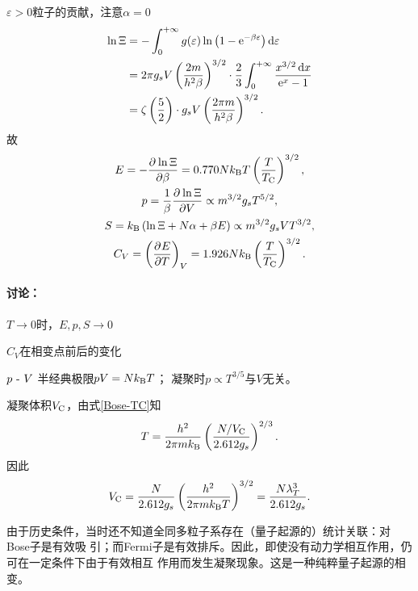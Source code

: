$\varepsilon>0$粒子的贡献，注意$\alpha=0$
\begin{align}\notag
	\ln\Xi&=-\int\zti g(\varepsilon)\ln\kh{1-\e{-\beta\varepsilon}}\d\varepsilon\\\notag
	&=2\pi g_sV\kh{\frac{2m}{h^2\beta}}^{3/2}\cdot\frac23\int\zti\frac{x^{3/2}\d x}{\e x-1}\\
	&=\zeta\kh{\frac52}\cdot g_sV\kh{\frac{2\pi m}{h^2\beta}}^{3/2}.%
\end{align}
故
\begin{gather}
	E=-\frac{\partial^{{}}\ln\Xi}{\partial{\beta}^{{}}}=0.770Nk_{\mathrm B} T\left(\frac T{T_\mathrm C}\right)^{3/2},\\
	p=\frac1\beta\frac{\partial^{{}}\ln\Xi}{\partial{V}^{{}}}\propto m^{3/2}g_sT^{5/2},\\
	S=k_{\mathrm B}\left(\ln\Xi+N\alpha+\beta E\right)\propto m^{3/2}g_sVT^{3/2},\\
	C_V=\left(\frac{\partial^{{}}E}{\partial{T}^{{}}}\right)_V=1.926Nk_{\mathrm B}\left(\frac T{T_\mathrm C}\right)^{3/2}.
\end{gather}
\paragraph{讨论：}
\begin{compactenum}
	\item $T\to 0$时，$E,p,S\to0$
	\item $C_V$在相变点前后的变化
	\begin{center}
	\end{center}
	\item $p~\text{-}~  V$
		\subitem 半经典极限$pV=Nk_{\mathrm B} T$；
		\subitem 凝聚时$p\propto T^{3/5}$与$V$无关。
	\item 凝聚体积$V_\mathrm C$，由式\eqref{Bose-TC}知
	\[
	T=\frac{h^2}{2\pi mk_{\mathrm B}}\left(\frac{N/V_\mathrm C}{2.612g_s}\right)^{2/3}.
\]
	因此 
	\begin{align}
		V_\mathrm C=\frac{N}{2.612g_s}\left(\frac{h^2}{2\pi mk_{\mathrm B} T}\right)^{3/2}=\frac{N\lambda_T^3}{2.612g_s}.
	\end{align}
\end{compactenum}
由于历史条件，当时还不知道全同多粒子系存在（量子起源的）统计关联：对Bose子是有效吸
引；而Fermi子是有效排斥。因此，即使没有动力学相互作用，仍可在一定条件下由于有效相互
作用而发生凝聚现象。这是一种纯粹量子起源的相变。

